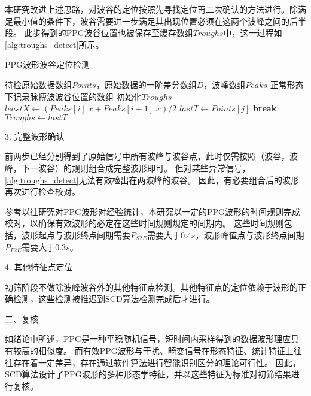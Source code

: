 本研究改进上述思路，对波谷的定位按照先寻找定位再二次确认的方法进行。除满足最小值的条件下，波谷需要进一步满足其出现位置必须在这两个波峰之间的后半段。
此步得到的PPG波谷位置也被保存至缓存数组$Troughs$中，这一过程如\autoref{alg:troughs_detect}所示。
\begin{breakablealgorithm}
    \caption{PPG波形波谷定位检测}
    \label{alg:troughs_detect}
    \begin{algorithmic}[1] %
        \Require 待检原始数据数组$Points$，原始数据的一阶差分数组$D$，波峰数组$Peaks$
        \Ensure 正常形态下记录脉搏波波谷位置的数组
            \State 初始化$Troughs$
                \State $leastX \gets (Peaks[i].x + Peaks[i+1].x )/2$
                            \State $lastT \gets Points[j]$
                            \State \textbf{break}
                        \EndIf
                    \EndFor
                \State $Troughs \gets lastT$
            \EndFor
            \State {}
        \EndFunction
    \end{algorithmic}
\end{breakablealgorithm}

3. 完整波形确认

前两步已经分别得到了原始信号中所有波峰与波谷点，此时仅需按照（波谷，波峰，下一波谷）的规则组合成完整波形即可。
但对某些异常信号，\autoref{alg:troughs_detect}无法有效检出在两波峰的波谷。
因此，有必要组合后的波形再次进行检查校对。

参考以往研究对PPG波形对经验统计，本研究以一定的PPG波形的时间规则完成校对，以确保有效波形的必定在这些时间规则规定的间期内。
这些时间规则包括，波形起点与波形终点间期需要$P_{S2E}$需要大于0.4$s$，波形峰值点与波形终点间期$P_{P2E}$需要大于0.3$s$。

4. 其他特征点定位

初筛阶段不做除波峰波谷外的其他特征点检测。其他特征点的定位依赖于波形的正确检测，这些检测被推迟到SCD算法检测完成后才进行。

二、复核

如绪论中所述，PPG是一种平稳随机信号，短时间内采样得到的数据波形理应具有较高的相似度\cite{Qiu2012}。
而有效PPG波形与干扰、畸变信号在形态特征、统计特征上往往存在着一定差异，存在通过软件算法进行智能识别区分的理论可行性。
因此，SCD算法设计了PPG波形的多种形态学特征，并以这些特征为标准对初筛结果进行复核。

